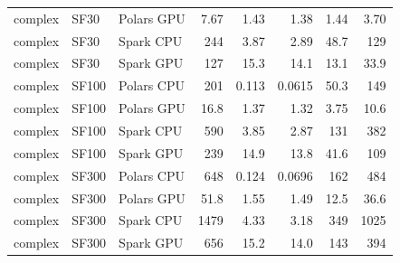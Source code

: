\begin{longtable}{lllrrrrr}
complex & SF30 & Polars GPU & 7.67 & 1.43 & 1.38 & 1.44 & 3.70 \\
complex & SF30 & Spark CPU & 244 & 3.87 & 2.89 & 48.7 & 129 \\
complex & SF30 & Spark GPU & 127 & 15.3 & 14.1 & 13.1 & 33.9 \\
complex & SF100 & Polars CPU & 201 & 0.113 & 0.0615 & 50.3 & 149 \\
complex & SF100 & Polars GPU & 16.8 & 1.37 & 1.32 & 3.75 & 10.6 \\
complex & SF100 & Spark CPU & 590 & 3.85 & 2.87 & 131 & 382 \\
complex & SF100 & Spark GPU & 239 & 14.9 & 13.8 & 41.6 & 109 \\
complex & SF300 & Polars CPU & 648 & 0.124 & 0.0696 & 162 & 484 \\
complex & SF300 & Polars GPU & 51.8 & 1.55 & 1.49 & 12.5 & 36.6 \\
complex & SF300 & Spark CPU & 1479 & 4.33 & 3.18 & 349 & 1025 \\
complex & SF300 & Spark GPU & 656 & 15.2 & 14.0 & 143 & 394 \\
\end{longtable}
